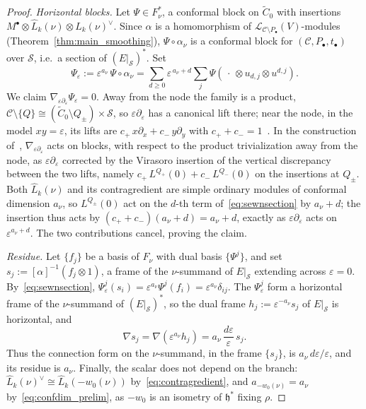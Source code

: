 \documentclass[12pt,a4paper,reqno]{amsart}
\numberwithin{equation}{section}
\theoremstyle{definition}
\renewcommand{\S}{\mathcal{S}}
\newcommand{\CCC}{\mathscr{C}}
\newcommand{\LL}{\mathcal{L}}
\def \h{\mathfrak{h}}
\def\o{\otimes}
\begin{document}
\begin{proof}
\emph{Horizontal blocks.} Let $\Psi\in F_\nu^\ast$, a conformal block on $\widetilde{C}_0$ with insertions $M^\bullet\o\hat{L}_k(\nu)\o\hat{L}_k(\nu)^\vee$. Since $\alpha$ is a homomorphism of $\LL_{\CCC\setminus P_\bullet}(V)$-modules (Theorem~\ref{thm:main_smoothing}), $\Psi\circ\alpha_\nu$ is a conformal block for $(\CCC,P_\bullet,t_\bullet)$ over $\S$, i.e.\ a section of $(E|_\S)^\ast$. Set
\begin{equation}\label{eq:sewnsection}
\Psi_\varepsilon:=\varepsilon^{a_\nu}\,\Psi\circ\alpha_\nu=\sum_{d\geq 0}\varepsilon^{\,a_\nu+d}\sum_{j}\Psi\!\left(\,\cdot\,\o u_{d,j}\o u^{d,j}\right).
\end{equation}
We claim $\nabla_{\varepsilon\partial_\varepsilon}\Psi_\varepsilon=0$. Away from the node the family is a product, $\CCC\setminus\{Q\}\cong(\widetilde{C}_0\setminus Q_\pm)\times\S$, so $\varepsilon\partial_\varepsilon$ has a canonical lift there; near the node, in the model $xy=\varepsilon$, its lifts are $c_+\,x\partial_x+c_-\,y\partial_y$ with $c_++c_-=1$~\cite[Lemma 33]{Loo13}. In the construction of~\cite[Theorem 7.1]{DGT1}, $\nabla_{\varepsilon\partial_\varepsilon}$ acts on blocks, with respect to the product trivialization away from the node, as $\varepsilon\partial_\varepsilon$ corrected by the Virasoro insertion of the vertical discrepancy between the two lifts, namely $c_+\,L^{Q_+}(0)+c_-\,L^{Q_-}(0)$ on the insertions at $Q_\pm$. Both $\hat{L}_k(\nu)$ and its contragredient are simple ordinary modules of conformal dimension $a_\nu$, so $L^{Q_\pm}(0)$ act on the $d$-th term of~\eqref{eq:sewnsection} by $a_\nu+d$; the insertion thus acts by $(c_++c_-)(a_\nu+d)=a_\nu+d$, exactly as $\varepsilon\partial_\varepsilon$ acts on $\varepsilon^{a_\nu+d}$. The two contributions cancel, proving the claim. 

\emph{Residue.} Let $\{f_j\}$ be a basis of $F_\nu$ with dual basis $\{\Psi^j\}$, and set $s_j:=[\alpha]^{-1}(f_j\o1)$, a frame of the $\nu$-summand of $E|_\S$ extending across $\varepsilon=0$. By~\eqref{eq:sewnsection}, $\Psi^j_\varepsilon(s_i)=\varepsilon^{a_\nu}\Psi^j(f_i)=\varepsilon^{a_\nu}\delta_{ij}$. The $\Psi^j_\varepsilon$ form a horizontal frame of the $\nu$-summand of $(E|_\S)^\ast$, so the dual frame $h_j:=\varepsilon^{-a_\nu}s_j$ of $E|_\S$ is horizontal, and
\[
\nabla s_j=\nabla(\varepsilon^{a_\nu}h_j)=a_\nu\,\frac{d\varepsilon}{\varepsilon}\,s_j .
\]
Thus the connection form on the $\nu$-summand, in the frame $\{s_j\}$, is $a_\nu\,d\varepsilon/\varepsilon$, and its residue is $a_\nu$. Finally, the scalar does not depend on the branch: $\hat{L}_k(\nu)^\vee\cong\hat{L}_k(-w_0(\nu))$ by~\eqref{eq:contragredient}, and $a_{-w_0(\nu)}=a_\nu$ by~\eqref{eq:confdim_prelim}, as $-w_0$ is an isometry of $\h^\ast$ fixing $\rho$.
\end{proof}
\end{document}
